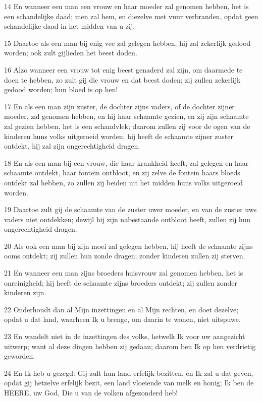 \par 14 En wanneer een man een vrouw en haar moeder zal genomen hebben, het is een schandelijke daad; men zal hem, en diezelve met vuur verbranden, opdat geen schandelijke daad in het midden van u zij.
\par 15 Daartoe als een man bij enig vee zal gelegen hebben, hij zal zekerlijk gedood worden; ook zult gijlieden het beest doden.
\par 16 Alzo wanneer een vrouw tot enig beest genaderd zal zijn, om daarmede te doen te hebben, zo zult gij die vrouw en dat beest doden; zij zullen zekerlijk gedood worden; hun bloed is op hen!
\par 17 En als een man zijn zuster, de dochter zijns vaders, of de dochter zijner moeder, zal genomen hebben, en hij haar schaamte gezien, en zij zijn schaamte zal gezien hebben, het is een schandvlek; daarom zullen zij voor de ogen van de kinderen huns volks uitgeroeid worden; hij heeft de schaamte zijner zuster ontdekt, hij zal zijn ongerechtigheid dragen.
\par 18 En als een man bij een vrouw, die haar krankheid heeft, zal gelegen en haar schaamte ontdekt, haar fontein ontbloot, en zij zelve de fontein haars bloeds ontdekt zal hebben, zo zullen zij beiden uit het midden huns volks uitgeroeid worden.
\par 19 Daartoe zult gij de schaamte van de zuster uwer moeder, en van de zuster uws vaders niet ontdekken; dewijl hij zijn nabestaande ontbloot heeft, zullen zij hun ongerechtigheid dragen.
\par 20 Als ook een man bij zijn moei zal gelegen hebben, hij heeft de schaamte zijns ooms ontdekt; zij zullen hun zonde dragen; zonder kinderen zullen zij sterven.
\par 21 En wanneer een man zijns broeders huisvrouw zal genomen hebben, het is onreinigheid; hij heeft de schaamte zijns broeders ontdekt; zij zullen zonder kinderen zijn.
\par 22 Onderhoudt dan al Mijn inzettingen en al Mijn rechten, en doet dezelve; opdat u dat land, waarheen Ik u brenge, om daarin te wonen, niet uitspuwe.
\par 23 En wandelt niet in de inzettingen des volks, hetwelk Ik voor uw aangezicht uitwerp; want al deze dingen hebben zij gedaan; daarom ben Ik op hen verdrietig geworden.
\par 24 En Ik heb u gezegd: Gij zult hun land erfelijk bezitten, en Ik zal u dat geven, opdat gij hetzelve erfelijk bezit, een land vloeiende van melk en honig; Ik ben de HEERE, uw God, Die u van de volken afgezonderd heb!
